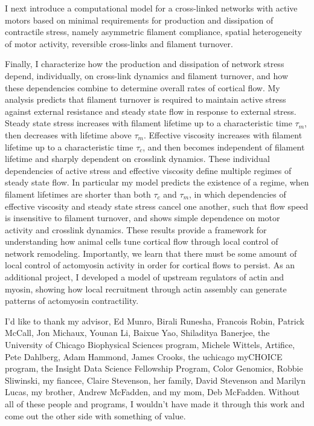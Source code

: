 \documentclass{easychithesis}
\begin{document}
I next introduce a computational model for a cross-linked networks with active motors based on minimal requirements for production and dissipation of contractile stress, namely asymmetric filament compliance, spatial heterogeneity of motor activity, reversible cross-links and filament turnover.  

Finally, I characterize how the production and dissipation of network stress depend, individually, on cross-link dynamics and filament turnover, and how these dependencies combine to determine overall rates of cortical flow. My analysis predicts that filament turnover is required to maintain active stress against external resistance and steady state flow in response to external stress. Steady state stress increases with filament lifetime up to a characteristic time $\tau_{m}$, then decreases with lifetime above $\tau_{m}$.   Effective viscosity increases with filament lifetime up to a characteristic time $\tau_c$, and then becomes independent of filament lifetime and sharply dependent on crosslink dynamics.  These individual dependencies of active stress and effective viscosity define multiple regimes of steady state flow.  In particular my model predicts the existence of a regime, when filament lifetimes are shorter than both $\tau_c$ and $\tau_{m}$, in which dependencies of effective viscosity and steady state stress cancel one another, such that flow speed is insensitive to filament turnover, and shows simple dependence on motor activity and crosslink dynamics.  These results provide a framework for understanding how animal cells tune cortical flow through local control of network remodeling.  Importantly, we learn that there must be some amount of local control of actomyosin activity in order for cortical flows to persist.  As an additional project, I developed a model of upstream regulators of actin and myosin, showing how local recruitment through actin assembly can generate patterns of actomyosin contractility. 


I'd like to thank my advisor, Ed Munro, Birali Runesha, Francois Robin, Patrick McCall, Jon Michaux, Younan Li, Baixue Yao, Shiladitya Banerjee, the University of Chicago Biophysical Sciences program, Michele Wittels, Artifice, Pete Dahlberg, Adam Hammond, James Crooks, the uchicago myCHOICE program, the Insight Data Science Fellowship Program, Color Genomics, Robbie Sliwinski, my fiancee, Claire Stevenson, her family, David Stevenson and Marilyn Lucas, my brother, Andrew McFadden, and my mom, Deb McFadden.  Without all of these people and programs, I wouldn't have made it through this work and come out the other side with something of value.
\end{document}
